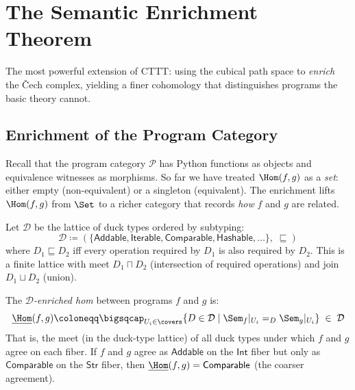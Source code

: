 
\chapter{The Semantic Enrichment Theorem}
\label{ch:enrichment}

The most powerful extension of CTTT: using the cubical path space
to \emph{enrich} the \v{C}ech complex, yielding a finer cohomology
that distinguishes programs the basic theory cannot.

\section{Enrichment of the Program Category}

Recall that the program category $\mathcal{P}$ has Python functions as
objects and equivalence witnesses as morphisms.  So far we have treated
$\Hom(f,g)$ as a \emph{set}: either empty (non-equivalent) or a
singleton (equivalent).  The enrichment lifts $\Hom(f,g)$ from
$\Set$ to a richer category that records \emph{how} $f$ and $g$ are
related.

\begin{definition}
\label{def:duck-lattice}
Let $\mathcal{D}$ be the lattice of duck types ordered by subtyping:
\[
  \mathcal{D} \coloneqq (\{\mathsf{Addable}, \mathsf{Iterable},
    \mathsf{Comparable}, \mathsf{Hashable}, \ldots\},\; \sqsubseteq)
\]
where $D_1 \sqsubseteq D_2$ iff every operation required by $D_1$ is
also required by $D_2$.  This is a finite lattice with meet
$D_1 \sqcap D_2$ (intersection of required operations) and join
$D_1 \sqcup D_2$ (union).
\end{definition}

\begin{definition}
\label{def:enriched-hom}
The \emph{$\mathcal{D}$-enriched hom} between programs $f$ and $g$ is:
\[
  \underline{\Hom}(f,g) \coloneqq \bigsqcap_{U_i \in \covers}
    \{D \in \mathcal{D} \mid
    \Sem_f|_{U_i} =_D \Sem_g|_{U_i}\} \;\in\; \mathcal{D}
\]
That is, the meet (in the duck-type lattice) of all duck types under
which $f$ and $g$ agree on each fiber.  If $f$ and $g$ agree as
$\mathsf{Addable}$ on the $\mathsf{Int}$ fiber but only as
$\mathsf{Comparable}$ on the $\mathsf{Str}$ fiber, then
$\underline{\Hom}(f,g) = \mathsf{Comparable}$ (the coarser agreement).
\end{definition}

